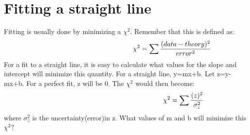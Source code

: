 \section{Fitting a straight line}
Fitting is usually done by minimizing a $\chi^{2}$. Remember that this is defined as: 
\begin{equation*}\hspace{48 mm}
\chi^2=\sum \frac{(data-theory)^{2}}{error^{2}}
\end{equation*}
For a fit to a straight line, it is easy to calculate what values for the slope and intercept will minimize this quantity. For a straight line, y=mx+b. Let z=y-mx+b. For a perfect fit, z will be 0. The $\chi^{2}$ would then become: 
\begin{equation*}\hspace{60 mm}
\chi^2=\sum \frac{(z)^{2}}{\sigma_{z}^{2}}
\end{equation*}
where $\sigma_{z}^{2}$ is the uncertainty(error)in z. What values of m and b will minimize this $\chi^{2}$? 

